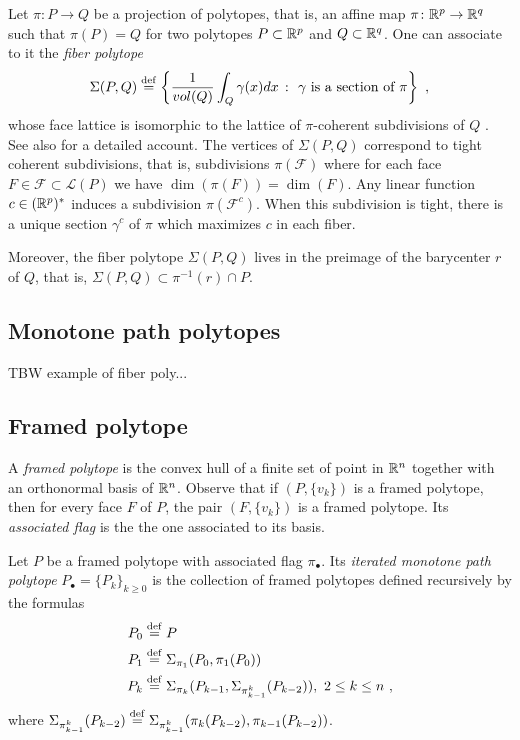 Let $\pi \colon P \to Q$ be a projection of polytopes, that is, an affine map $\pi \colon \mathbb{R}^p \to \mathbb{R}^q$ such that $\pi(P)=Q$ for two polytopes $P\subset \mathbb{R}^p$ and $Q \subset \mathbb{R}^q$.
One can associate to it the \emph{fiber polytope} \[\Sigma(P,Q) \stackrel{\mathrm{def}}{=} \left\{ \frac{1}{vol(Q)}\int_Q \gamma(x)dx \ \colon \ \gamma \text{ is a section of }\pi \right\} \ , \] whose face lattice is isomorphic to the lattice of $\pi$-coherent subdivisions of $Q$ \cite{BilleraSturmfels92}.
See also \cite[Chapter 9]{Ziegler95} for a detailed account.
The vertices of $\Sigma(P,Q)$ correspond to tight coherent subdivisions, that is, subdivisions $\pi(\mathcal{F})$ where for each face $F \in \mathcal{F}\subset\mathcal{L}(P)$ we have $\dim(\pi(F))=\dim(F)$.
Any linear function $c\in (\mathbb{R}^p)^{*}$ induces a subdivision $\pi(\mathcal{F}^c)$.
When this subdivision is tight, there is a unique section $\gamma^c$ of $\pi$ which maximizes $c$ in each fiber.

Moreover, the fiber polytope $\Sigma(P,Q)$ lives in the preimage of the barycenter $r$ of $Q$, that is, $\Sigma(P,Q)\subset\pi^{-1}(r)\cap P$.

\subsection{Monotone path polytopes}

TBW example of fiber poly...

\subsection{Framed polytope}

A \textit{framed polytope} is the convex hull of a finite set of point in $\mathbb{R}^n$ together with an orthonormal basis of $\mathbb{R}^n$.
Observe that if $(P, \{v_k\})$ is a framed polytope, then for every face $F$ of $P$, the pair $(F, \{v_k\})$ is a framed polytope.
Its \textit{associated flag} is the the one associated to its basis.

\begin{definition}
	Let $P$ be a framed polytope with associated flag $\pi_\bullet$.
	Its \textit{iterated monotone path polytope} $P_\bullet = \{P_k\}_{k \geq 0}$ is the collection of framed polytopes defined recursively by the formulas
	\begin{align*}
		P_0 & \stackrel{\mathrm{def}}{=} P \\
		P_1 & \stackrel{\mathrm{def}}{=} \Sigma_{\pi_1}(P_0,\pi_1(P_0)) \\
		P_k & \stackrel{\mathrm{def}}{=} \Sigma_{\pi_k}(P_{k-1},\Sigma_{\pi^{k}_{k-1}}(P_{k-2})), \ 2 \leq k \leq n \ ,
	\end{align*}
	where $\Sigma_{\pi^{k}_{k-1}}(P_{k-2})\stackrel{\mathrm{def}}{=} \Sigma_{\pi^{k}_{k-1}}(\pi_k(P_{k-2}),\pi_{k-1}(P_{k-2}))$.
\end{definition}


